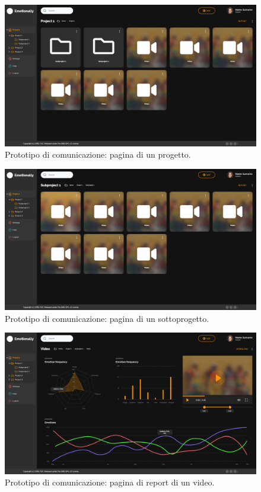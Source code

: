 \begin{figure}[H]
	\centering
	\caption{Prototipo di comunicazione: pagina di un progetto.}
	\label{fig:prototipo-comunicazione:project}
	\includegraphics[width=\textwidth]{images/prototipo-comunicazione/project.png}
\end{figure}

\begin{figure}[H]
	\centering
	\caption{Prototipo di comunicazione: pagina di un sottoprogetto.}
	\label{fig:prototipo-comunicazione:subproject}
	\includegraphics[width=\textwidth]{images/prototipo-comunicazione/subproject.png}
\end{figure}

\begin{figure}[H]
	\centering
	\caption{Prototipo di comunicazione: pagina di report di un video.}
	\label{fig:prototipo-comunicazione:video-report}
	\includegraphics[width=\textwidth]{images/prototipo-comunicazione/report video.png}
\end{figure}

